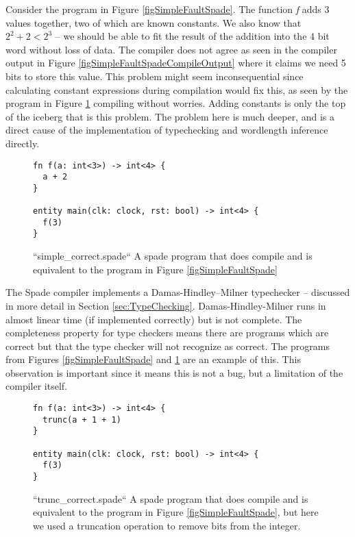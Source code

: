 Consider the program in Figure \ref{figSimpleFaultSpade}. The function \textit{f} adds 3 values together, two of which are known constants. We also know that $2^2 + 2 < 2^3$ -- we should be able to fit the result of the addition into the 4 bit word without loss of data. The compiler does not agree as seen in the compiler output in Figure \ref{figSimpleFaultSpadeCompileOutput} where it claims we need 5 bits to store this value. This problem might seem inconsequential since calculating constant expressions during compilation would fix this, as seen by the program in Figure \ref{figSimpleCorrectSpade} compiling without worries. Adding constants is only the top of the iceberg that is this problem. The problem here is much deeper, and is a direct cause of the implementation of typechecking and wordlength inference directly.

\begin{figure}
\centering
  \begin{verbatim}
fn f(a: int<3>) -> int<4> {
  a + 2
}

entity main(clk: clock, rst: bool) -> int<4> {
  f(3)
}
\end{verbatim}
  \caption{``simple\_correct.spade`` A spade program that does compile and is equivalent to the program in Figure \ref{figSimpleFaultSpade}}
\label{figSimpleCorrectSpade}
\end{figure}

The Spade compiler implements a Damas-Hindley–Milner typechecker -- discussed in more detail in Section \ref{sec:TypeChecking}. Damas-Hindley-Milner runs in almost linear time (if implemented correctly) but is not complete. The completeness property for type checkers means there are programs which are correct but that the type checker will not recognize as correct. The programs from Figures \ref{figSimpleFaultSpade} and \ref{figSimpleCorrectSpade} are an example of this. This observation is important since it means this is not a bug, but a limitation of the compiler itself.

\begin{figure}
\centering
  \begin{verbatim}
fn f(a: int<3>) -> int<4> {
  trunc(a + 1 + 1)
}

entity main(clk: clock, rst: bool) -> int<4> {
  f(3)
}
\end{verbatim}
  \caption{``trunc\_correct.spade`` A spade program that does compile and is equivalent to the program in Figure \ref{figSimpleFaultSpade}, but here we used a truncation operation to remove bits from the integer.}
\label{figSimpleTruncSpade}
\end{figure}

